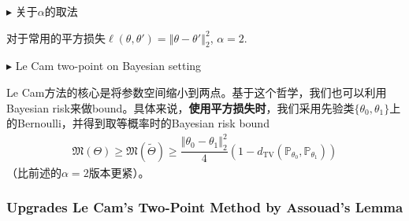 \documentclass[11pt,a4paper]{ctexart}
\numberwithin{equation}{section}%
\newenvironment{point}{\raggedright$\blacktriangleright$}{}
\begin{document}
\begin{point}
    关于$ \alpha  $的取法
\end{point}

对于常用的平方损失$ \ell(\theta ,\theta ')= \left\Vert \theta -\theta ' \right\Vert _2^2  $, $ \alpha =2 $.


\begin{point}
    Le Cam two-point on Bayesian setting
\end{point}

Le Cam方法的核心是将参数空间缩小到两点。基于这个哲学，我们也可以利用Bayesian risk来做bound。具体来说，\textbf{使用平方损失时}，我们采用先验类$ \{\theta _0,\theta _1\} $上的Bernoulli，并得到取等概率时的Bayesian risk bound
\begin{align*}
    \mathfrak{M}(\Theta)\geq \mathfrak{M}(\tilde{\Theta})\geq \dfrac{ \left\Vert \theta _0-\theta _1 \right\Vert _2^2 }{ 4  }\left( 1-d_{\mathrm{ TV } }(\mathbb{P}_{\theta _0},\mathbb{P}_{\theta _1}) \right) 
\end{align*}
（比前述的$ \alpha =2 $版本更紧）。





\subsubsection{Upgrades Le Cam's Two-Point Method by Assouad's Lemma}
\end{document}

